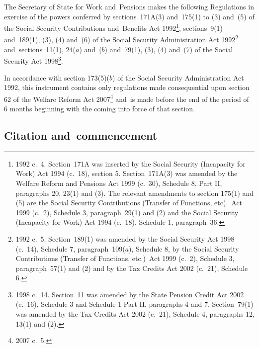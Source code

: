 \documentclass[12pt,a4paper]{article}
\title{\regstitle}
\author{S.I.\ 2007 No.\ 1626}
\date{Made
7th June 2007\\
Laid before Parliament
12th June 2007\\
Coming into~force
3rd July 2007
}
\begin{document}
\maketitle

\noindent
The Secretary of State for Work and~Pensions makes the following Regulations in exercise of the powers conferred by sections~171A(3) and~175(1) to (3) and~(5) of the Social Security Contributions and~Benefits Act 1992\footnote{1992 c.~4. Section~171A was inserted by the Social Security (Incapacity for Work) Act 1994 (c.~18), section 5. Section~171A(3) was amended by the Welfare Reform and Pensions Act 1999 (c.~30), Schedule 8, Part II, paragraphs 20, 23(1) and (3). The relevant amendments to section 175(1) and (5) are the Social Security Contributions (Transfer of Functions, etc).\ Act 1999 (c.~2), Schedule 3, paragraph~29(1) and (2) and the Social Security (Incapacity for Work) Act 1994 (c.~18), Schedule 1, paragraph~36.}, sections~9(1) and~189(1), (3), (4) and~(6) of the Social Security Administration Act 1992\footnote{1992 c.~5. Section~189(1) was amended by the Social Security Act 1998 (c.~14), Schedule 7, paragraph~109($a$), Schedule 8, by the Social Security Contributions (Transfer of Functions, etc.)\ Act 1999 (c.~2), Schedule 3, paragraph~57(1) and (2) and by the Tax Credits Act 2002 (c.~21), Schedule 6.} and~sections~11(1), 24($a$)  and~($b$)  and~79(1), (3), (4) and~(7) of the Social Security Act 1998\footnote{1998 c.~14. Section~11 was amended by the State Pension Credit Act 2002 (c.~16), Schedule 3 and Schedule 1 Part II, paragraphs 4 and 7. Section~79(1) was amended by the Tax Credits Act 2002 (c.~21), Schedule 4, paragraphs 12, 13(1) and (2).}.

In accordance with section 173(5)($b$)  of the Social Security Administration Act 1992, this instrument contains only regulations made consequential upon section 62 of the Welfare Reform Act 2007\footnote{2007 c.~5.} and~is made before the end of the period of 6 months beginning with the coming into force of that section. 

{\sloppy

\tableofcontents

}

\bigskip

\setcounter{secnumdepth}{-2}

\subsection[1. Citation and~commencement]{Citation and~commencement}
\end{document}

